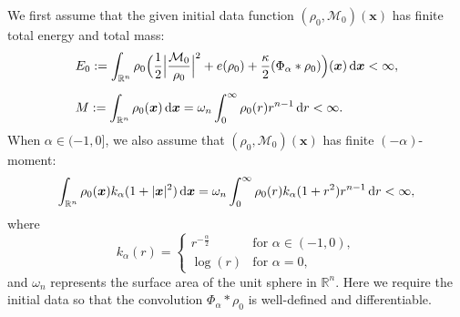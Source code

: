 \documentclass[reqno,11pt]{amsart}
\numberwithin{equation}{section}
\theoremstyle{definition}
\def\dd{{\, \rm d}}
\def\M{{\mathcal{M}}}
\begin{document}
We first assume that the given initial data function $(\rho_0,\M_0)(\boldsymbol{x})$ has finite total energy and
total mass:
\begin{align}
&E_0 := \int_{\mathbb{R}^n}\rho_0 \Big( \frac{1}{2} \Big| \frac{\M_0}{\rho_0}\Big|^2
+ e(\rho_0) + \frac{\kappa}{2} (\Phi_\alpha * \rho_0) \Big)(\boldsymbol{x})
\dd \boldsymbol{x} < \infty,\label{0.7}\\[2mm]
&M := \int_{\mathbb{R}^n} \rho_0(\boldsymbol{x}) \dd \boldsymbol{x} = \omega_n \int^\infty_0 \rho_0(r) r^{n-1} \dd r < \infty.\nonumber
\end{align}
When
$\alpha \in (-1,0]$, we also assume that $(\rho_0,\M_0)(\boldsymbol{x})$ has
finite $(-\alpha)$-moment:
\begin{equation}\label{0.81}
\int_{\mathbb{R}^n} \rho_0(\boldsymbol{x}) k_\alpha (1 + |\boldsymbol{x}|^2) \dd \boldsymbol{x} = \omega_n \int^\infty_0 \rho_0(r) k_\alpha (1 + r^2) r^{n-1} \dd r < \infty,
\end{equation}
where
\begin{equation*}
    k_\alpha(r) = \begin{cases}
  r^{- \frac{\alpha}{2}} \quad &\mbox{for $\alpha \in (-1,0)$}, \\
  \log(r) &\mbox{for $\alpha = 0$},
    \end{cases}
\end{equation*}
and $\omega_n$ represents the surface area of the unit sphere in $\mathbb{R}^n$.
Here we require the initial data so that the convolution $\Phi_\alpha*\rho_0$ is well-defined and differentiable. 
\end{document}
